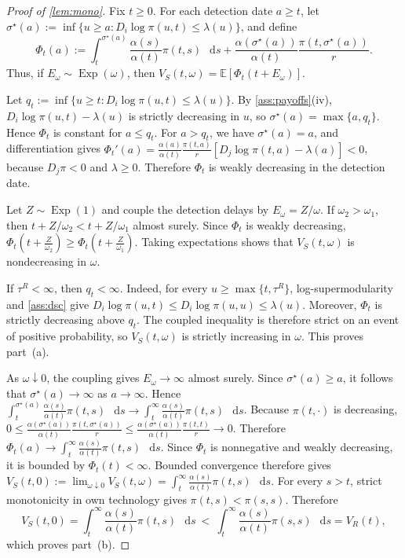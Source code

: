 \documentclass[12pt,reqno]{article}
\newcommand{\de}{\mathop{}\!\mathrm{d}}
\newcommand{\Ex}{\mathbb{E}}
\theoremstyle{definition} \newtheorem{example}{Example}
\theoremstyle{definition} \newtheorem{condition}{Condition}
\theoremstyle{definition} \newtheorem{corollary}{Corollary}
\theoremstyle{definition} \newtheorem{claim}{Claim}
\theoremstyle{definition} \newtheorem{definition}{Definition}
\theoremstyle{definition} \newtheorem{conjecture}{Conjecture}
\theoremstyle{definition} \newtheorem{Lemma}{Lemma}
\theoremstyle{definition} \newtheorem{lemma}{Lemma}
\theoremstyle{plain} \newtheorem{theorem}{Theorem}
\theoremstyle{definition} \newtheorem{assumption}{Assumption}
\theoremstyle{definition} \newtheorem*{assumptionnonumber}{Assumption}
\theoremstyle{definition} \newtheorem*{theoremNoNumber}{Proposition}
\theoremstyle{definition}
\theoremstyle{definition}\newtheorem{proposition}{Proposition}
\theoremstyle{definition} \newtheorem{result}{Result}
\theoremstyle{definition} \newtheorem*{definitionNoNumber}{Definition}
\theoremstyle{definition} \newtheorem{Definition}{Definition}
\theoremstyle{definition} \newtheorem*{DefinitionNoNumber}{Definition}
\theoremstyle{definition} \newtheorem*{fact}{Fact}
\theoremstyle{definition} \newtheorem*{property}{Property}
\theoremstyle{definition} \newtheorem{remark}{Remark}
\begin{document}
\begin{proof}[Proof of \cref{lem:mono}]


%

Fix $t\geq 0$. For each detection date $a\geq t$, let
$\sigma^\star(a) := \inf\{u\geq a: D_i\log\pi(u,t)\leq\lambda(u)\}$,
and define
\[
\Phi_t(a)
:=
\int_t^{\sigma^\star(a)}
\frac{\alpha(s)}{\alpha(t)}\pi(t,s)\,\de s
+
\frac{\alpha(\sigma^\star(a))}{\alpha(t)}
\frac{\pi(t,\sigma^\star(a))}{r}.
\]
Thus, if $E_\omega\sim\operatorname{Exp}(\omega)$, then
$V_S(t,\omega)=\Ex[\Phi_t(t+E_\omega)]$.

Let $q_t := \inf\{u\geq t: D_i\log\pi(u,t)\leq\lambda(u)\}$.
By \cref{ass:payoffs}(iv), $D_i\log\pi(u,t)-\lambda(u)$ is strictly
decreasing in $u$, so $\sigma^\star(a)=\max\{a,q_t\}$. Hence $\Phi_t$
is constant for $a\leq q_t$. For $a>q_t$, we have
$\sigma^\star(a)=a$, and differentiation gives
$\Phi_t'(a) = \frac{\alpha(a)}{\alpha(t)}\frac{\pi(t,a)}{r}
\left[D_j\log\pi(t,a)-\lambda(a)\right] < 0$,
because $D_j\pi<0$ and $\lambda\geq 0$. Therefore $\Phi_t$ is weakly
decreasing in the detection date.

Let $Z\sim\operatorname{Exp}(1)$ and couple the detection delays by
$E_\omega=Z/\omega$. If $\omega_2>\omega_1$, then
$t+Z/\omega_2<t+Z/\omega_1$ almost surely. Since $\Phi_t$ is weakly
decreasing, $\Phi_t\left(t+\frac{Z}{\omega_2}\right)
\geq
\Phi_t\left(t+\frac{Z}{\omega_1}\right)$.
Taking expectations shows that $V_S(t,\omega)$ is nondecreasing in
$\omega$.

If $\tau^R<\infty$, then $q_t<\infty$. Indeed, for every
$u\geq\max\{t,\tau^R\}$, log-supermodularity and \cref{ass:dsc} give
$D_i\log\pi(u,t) \leq D_i\log\pi(u,u) \leq \lambda(u)$.
Moreover, $\Phi_t$ is strictly decreasing above $q_t$. The coupled
inequality is therefore strict on an event of positive probability,
so $V_S(t,\omega)$ is strictly increasing in $\omega$. This proves
part~(a).

As $\omega\downarrow 0$, the coupling gives $E_\omega\to\infty$
almost surely. Since $\sigma^\star(a)\geq a$, it follows that
$\sigma^\star(a)\to\infty$ as $a\to\infty$. Hence
$\int_t^{\sigma^\star(a)}
\frac{\alpha(s)}{\alpha(t)}\pi(t,s)\,\de s
\longrightarrow
\int_t^\infty
\frac{\alpha(s)}{\alpha(t)}\pi(t,s)\,\de s$.
Because $\pi(t,\cdot)$ is decreasing,
$0
\leq
\frac{\alpha(\sigma^\star(a))}{\alpha(t)}
\frac{\pi(t,\sigma^\star(a))}{r}
\leq
\frac{\alpha(\sigma^\star(a))}{\alpha(t)}
\frac{\pi(t,t)}{r}
\longrightarrow
0$.
Therefore $\Phi_t(a)
\longrightarrow
\int_t^\infty
\frac{\alpha(s)}{\alpha(t)}\pi(t,s)\,\de s$.
Since $\Phi_t$ is nonnegative and weakly decreasing, it is bounded by
$\Phi_t(t)<\infty$. Bounded convergence therefore gives
$V_S(t,0)
:=
\lim_{\omega\downarrow 0}V_S(t,\omega)
=
\int_t^\infty
\frac{\alpha(s)}{\alpha(t)}\pi(t,s)\,\de s$. For every $s>t$, strict monotonicity in own technology gives
$\pi(t,s)<\pi(s,s)$. Therefore
\[
V_S(t,0)
=
\int_t^\infty\frac{\alpha(s)}{\alpha(t)}\pi(t,s)\,\de s
\ <\
\int_t^\infty\frac{\alpha(s)}{\alpha(t)}\pi(s,s)\,\de s
=
V_R(t),
\]
which proves part~(b).


\end{proof}
\end{document}
